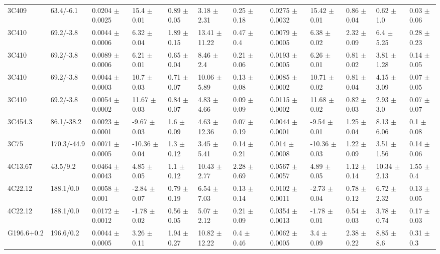 \documentclass[preprint]{emulateapj}
\begin{document}
\begin{table}
\begin{tabular}{ lllllllclllll  }
3C409 & 63.4/-6.1 & 0.0204 $\pm$ 0.0025 & 15.4 $\pm$ 0.01 & 0.89 $\pm$ 0.05 & 3.18 $\pm$ 2.31 & 0.25 $\pm$ 0.18 & &  0.0275 $\pm$ 0.0032 & 15.42 $\pm$ 0.01 & 0.86 $\pm$ 0.04 & 0.62 $\pm$ 1.0 & 0.03 $\pm$ 0.06 \\
3C410 & 69.2/-3.8 & 0.0044 $\pm$ 0.0006 & 6.32 $\pm$ 0.04 & 1.89 $\pm$ 0.15 & 13.41 $\pm$ 11.22 & 0.47 $\pm$ 0.4 & &  0.0079 $\pm$ 0.0005 & 6.38 $\pm$ 0.02 & 2.32 $\pm$ 0.09 & 6.4 $\pm$ 5.25 & 0.28 $\pm$ 0.23 \\
3C410 & 69.2/-3.8 & 0.0089 $\pm$ 0.0006 & 6.21 $\pm$ 0.01 & 0.65 $\pm$ 0.04 & 8.46 $\pm$ 2.4 & 0.21 $\pm$ 0.06 & &  0.0193 $\pm$ 0.0005 & 6.26 $\pm$ 0.01 & 0.81 $\pm$ 0.02 & 3.81 $\pm$ 1.28 & 0.14 $\pm$ 0.05 \\
3C410 & 69.2/-3.8 & 0.0044 $\pm$ 0.0003 & 10.7 $\pm$ 0.03 & 0.71 $\pm$ 0.07 & 10.06 $\pm$ 5.89 & 0.13 $\pm$ 0.08 & &  0.0085 $\pm$ 0.0002 & 10.71 $\pm$ 0.02 & 0.81 $\pm$ 0.04 & 4.15 $\pm$ 3.09 & 0.07 $\pm$ 0.05 \\
3C410 & 69.2/-3.8 & 0.0054 $\pm$ 0.0002 & 11.67 $\pm$ 0.03 & 0.84 $\pm$ 0.07 & 4.83 $\pm$ 4.66 & 0.09 $\pm$ 0.09 & &  0.0115 $\pm$ 0.0002 & 11.68 $\pm$ 0.02 & 0.82 $\pm$ 0.03 & 2.93 $\pm$ 3.0 & 0.07 $\pm$ 0.07 \\
3C454.3 & 86.1/-38.2 & 0.0023 $\pm$ 0.0001 & -9.67 $\pm$ 0.03 & 1.6 $\pm$ 0.09 & 4.63 $\pm$ 12.36 & 0.07 $\pm$ 0.19 & &  0.0044 $\pm$ 0.0001 & -9.54 $\pm$ 0.01 & 1.25 $\pm$ 0.04 & 8.13 $\pm$ 6.06 & 0.1 $\pm$ 0.08 \\
3C75 & 170.3/-44.9 & 0.0071 $\pm$ 0.0005 & -10.36 $\pm$ 0.04 & 1.3 $\pm$ 0.12 & 3.45 $\pm$ 5.41 & 0.14 $\pm$ 0.21 & &  0.014 $\pm$ 0.0008 & -10.36 $\pm$ 0.03 & 1.22 $\pm$ 0.09 & 3.51 $\pm$ 1.56 & 0.14 $\pm$ 0.06 \\
4C13.67 & 43.5/9.2 & 0.0464 $\pm$ 0.0043 & 4.85 $\pm$ 0.05 & 1.1 $\pm$ 0.12 & 10.43 $\pm$ 2.77 & 2.28 $\pm$ 0.69 & &  0.0567 $\pm$ 0.0057 & 4.89 $\pm$ 0.05 & 1.12 $\pm$ 0.14 & 10.34 $\pm$ 2.13 & 1.55 $\pm$ 0.4 \\
4C22.12 & 188.1/0.0 & 0.0058 $\pm$ 0.001 & -2.84 $\pm$ 0.07 & 0.79 $\pm$ 0.19 & 6.54 $\pm$ 7.03 & 0.13 $\pm$ 0.14 & &  0.0102 $\pm$ 0.0011 & -2.73 $\pm$ 0.04 & 0.78 $\pm$ 0.12 & 6.72 $\pm$ 2.32 & 0.13 $\pm$ 0.05 \\
4C22.12 & 188.1/0.0 & 0.0172 $\pm$ 0.0012 & -1.78 $\pm$ 0.02 & 0.56 $\pm$ 0.05 & 5.07 $\pm$ 2.12 & 0.21 $\pm$ 0.09 & &  0.0354 $\pm$ 0.0013 & -1.78 $\pm$ 0.01 & 0.54 $\pm$ 0.03 & 3.78 $\pm$ 0.74 & 0.17 $\pm$ 0.03 \\
G196.6+0.2 & 196.6/0.2 & 0.0044 $\pm$ 0.0005 & 3.26 $\pm$ 0.11 & 1.94 $\pm$ 0.27 & 10.82 $\pm$ 12.22 & 0.4 $\pm$ 0.46 & &  0.0062 $\pm$ 0.0005 & 3.4 $\pm$ 0.09 & 2.38 $\pm$ 0.22 & 8.85 $\pm$ 8.6 & 0.31 $\pm$ 0.3 \\

\end{tabular}
\end{table}
\end{document}

